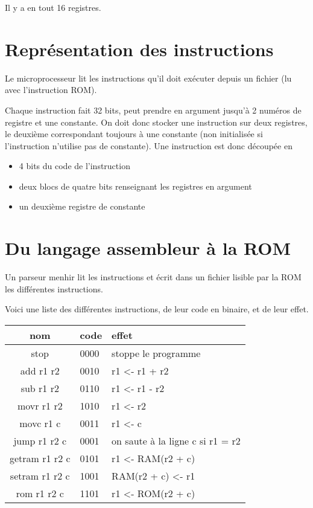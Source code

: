 \documentclass[12pt,a4paper,french]{article}
\begin{document}
Il y a en tout 16 registres.



\section{Représentation des instructions}

Le microprocesseur lit les instructions qu'il doit exécuter depuis un fichier (lu avec l'instruction ROM).

Chaque instruction fait 32 bits, peut prendre en argument jusqu'à 2 numéros de registre et une constante. On doit donc stocker une instruction sur deux registres, le deuxième correspondant toujours à une constante (non initialisée si l'instruction n'utilise pas de constante). Une instruction est donc découpée en 

\begin{itemize}
    \item 4 bits du code de l'instruction
    \item deux blocs de quatre bits renseignant les registres en argument
    \item un deuxième registre de constante
\end{itemize}


\section{Du langage assembleur à la ROM}

Un parseur menhir lit les instructions et écrit dans un fichier lisible par la ROM les différentes instructions.

Voici une liste des différentes instructions, de leur code en binaire, et de leur effet.

\;



\begin{tabularx}{15cm}{|c|p{4cm}|X|}
    \hline
    nom & code & effet \\
    \hline
    stop & 0000 & stoppe le programme \\
    \hline
    add r1 r2 & 0010 & r1 <- r1 + r2 \\
    \hline
    sub r1 r2 & 0110 & r1 <- r1 - r2 \\
    \hline
    movr r1 r2 & 1010 & r1 <- r2 \\
    \hline
    movc r1 c & 0011 & r1 <- c \\
    \hline
    jump r1 r2 c & 0001 & on saute à la ligne c si r1 = r2 \\
    \hline
    getram r1 r2 c & 0101 & r1 <- RAM(r2 + c) \\
    \hline
    setram r1 r2 c & 1001 & RAM(r2 + c) <- r1 \\
    \hline
    rom r1 r2 c & 1101 & r1 <- ROM(r2 + c) \\
    \hline
\end{tabularx}
\end{document}

